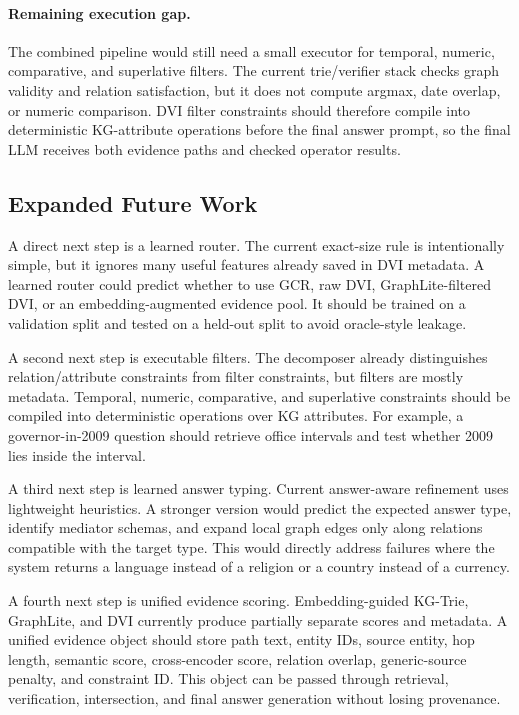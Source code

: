 \documentclass[10pt,twocolumn]{article}
\begin{document}
\paragraph{Remaining execution gap.}
The combined pipeline would still need a small executor for temporal, numeric, comparative, and superlative filters. The current trie/verifier stack checks graph validity and relation satisfaction, but it does not compute argmax, date overlap, or numeric comparison. DVI filter constraints should therefore compile into deterministic KG-attribute operations before the final answer prompt, so the final LLM receives both evidence paths and checked operator results.


\subsection{Expanded Future Work}
A direct next step is a learned router. The current exact-size rule is intentionally simple, but it ignores many useful features already saved in DVI metadata. A learned router could predict whether to use GCR, raw DVI, GraphLite-filtered DVI, or an embedding-augmented evidence pool. It should be trained on a validation split and tested on a held-out split to avoid oracle-style leakage.

A second next step is executable filters. The decomposer already distinguishes relation/attribute constraints from filter constraints, but filters are mostly metadata. Temporal, numeric, comparative, and superlative constraints should be compiled into deterministic operations over KG attributes. For example, a governor-in-2009 question should retrieve office intervals and test whether 2009 lies inside the interval.

A third next step is learned answer typing. Current answer-aware refinement uses lightweight heuristics. A stronger version would predict the expected answer type, identify mediator schemas, and expand local graph edges only along relations compatible with the target type. This would directly address failures where the system returns a language instead of a religion or a country instead of a currency.

A fourth next step is unified evidence scoring. Embedding-guided KG-Trie, GraphLite, and DVI currently produce partially separate scores and metadata. A unified evidence object should store path text, entity IDs, source entity, hop length, semantic score, cross-encoder score, relation overlap, generic-source penalty, and constraint ID. This object can be passed through retrieval, verification, intersection, and final answer generation without losing provenance.
\end{document}
